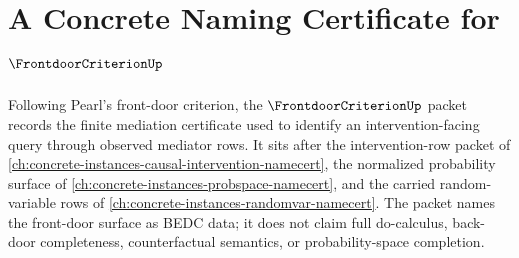 \chapter{A Concrete Naming Certificate for $\FrontdoorCriterionUp$}
\label{ch:concrete-instances-frontdoor-criterion-namecert}

Following Pearl's front-door criterion, the $\FrontdoorCriterionUp$ packet records the finite mediation certificate used to identify an intervention-facing query through observed mediator rows. It sits after the intervention-row packet of \autoref{ch:concrete-instances-causal-intervention-namecert}, the normalized probability surface of \autoref{ch:concrete-instances-probspace-namecert}, and the carried random-variable rows of \autoref{ch:concrete-instances-randomvar-namecert}. The packet names the front-door surface as BEDC data; it does not claim full do-calculus, back-door completeness, counterfactual semantics, or probability-space completion.

